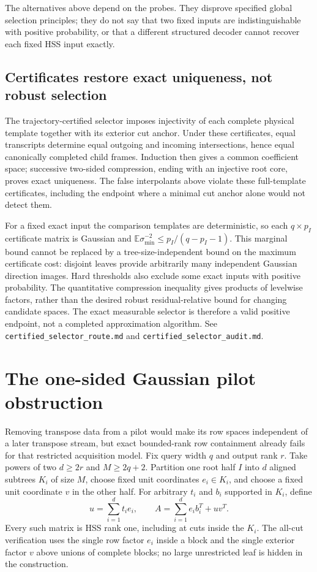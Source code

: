 \documentclass[11pt,oneside,openany,a4paper]{book}
\numberwithin{equation}{chapter}
\theoremstyle{definition}
\theoremstyle{remark}
\newcommand{\sourcefile}[1]{{\small\nolinkurl{#1}}}
\begin{document}
The alternatives above depend on the probes.  They disprove specified
global selection principles; they do not say that two fixed inputs are
indistinguishable with positive probability, or that a different
structured decoder cannot recover each fixed HSS input exactly.

\subsection{Certificates restore exact uniqueness, not robust selection}

The trajectory-certified selector imposes injectivity of each complete
physical template together with its exterior cut anchor.  Under these
certificates, equal transcripts determine equal outgoing and incoming
intersections, hence equal canonically completed child frames.  Induction
then gives a common coefficient space; successive two-sided compression,
ending with an injective root core, proves exact uniqueness.  The false
interpolants above violate these full-template certificates, including
the endpoint where a minimal cut anchor alone would not detect them.

For a fixed exact input the comparison templates are deterministic, so
each $q\times p_I$ certificate matrix is Gaussian and
$\mathbb E\sigma_{\min}^{-2}\le p_I/(q-p_I-1)$.  This marginal
bound cannot be replaced by a tree-size-independent bound on the
maximum certificate cost: disjoint leaves provide arbitrarily many
independent Gaussian direction images.  Hard thresholds also exclude
some exact inputs with positive probability.  The quantitative
compression inequality gives products of levelwise factors, rather
than the desired robust residual-relative bound for changing candidate
spaces.  The exact measurable selector is therefore a valid positive
endpoint, not a completed approximation algorithm.
See \sourcefile{certified_selector_route.md} and
\sourcefile{certified_selector_audit.md}.

\section{The one-sided Gaussian pilot obstruction}

Removing transpose data from a pilot would make its row spaces
independent of a later transpose stream, but exact bounded-rank row
containment already fails for that restricted acquisition model.
Fix query width $q$ and output rank $r$.  Take powers of two
$d\ge2r$ and $M\ge2q+2$.  Partition one root half $I$ into $d$ aligned
subtrees $K_i$ of size $M$, choose fixed unit coordinates $e_i\in K_i$,
and choose a fixed unit coordinate $v$ in the other half.  For arbitrary
$t_i$ and $b_i$ supported in $K_i$, define
\[
 u=\sum_{i=1}^d t_i e_i,
 \qquad A=\sum_{i=1}^d e_i b_i^T+uv^T.
\]
Every such matrix is HSS rank one, including at cuts inside the $K_i$.
The all-cut verification uses the single row factor $e_i$ inside a
block and the single exterior factor $v$ above unions of complete
blocks; no large unrestricted leaf is hidden in the construction.
\end{document}
